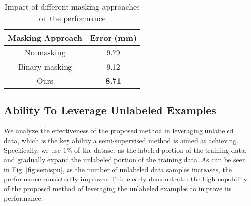 \documentclass{article}
\begin{document}
\begin{table}[t]
\caption{Impact of different masking approaches on the performance}
\setlength{\tabcolsep}{4pt}
\centering
\begin{tabular}{cc}
\hline
            Masking Approach  &   Error (mm)  \\
            \hline
                No masking          &         9.79 \\
                Binary-masking      &       9.12 \\
                Ours                &        \textbf{ 8.71} \\
        
        
        \hline
        \end{tabular}
        \label{tab:masking}
\end{table}

\subsection{Ability To Leverage Unlabeled Examples}
We analyze the effectiveness of the proposed method in leveraging unlabeled data, which is the key ability a semi-supervised method is aimed at achieving. Specifically, we use $1\%$ of the dataset as the labeled portion of the training data, and gradually expand the unlabeled portion of the training data. As can be seen in Fig. \ref{fig:semispu}, as the number of unlabeled data samples increases, the performance consistently improves. This clearly demonstrates the high capability of the proposed method of leveraging the unlabeled examples to improve its performance. 
\end{document}
